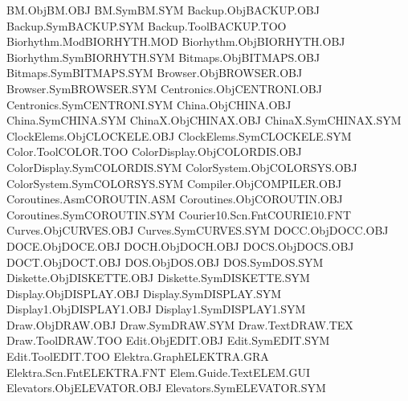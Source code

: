 BM.Obj                          BM.OBJ       
BM.Sym                          BM.SYM       
Backup.Obj                      BACKUP.OBJ   
Backup.Sym                      BACKUP.SYM   
Backup.Tool                     BACKUP.TOO   
Biorhythm.Mod                   BIORHYTH.MOD 
Biorhythm.Obj                   BIORHYTH.OBJ 
Biorhythm.Sym                   BIORHYTH.SYM 
Bitmaps.Obj                     BITMAPS.OBJ  
Bitmaps.Sym                     BITMAPS.SYM  
Browser.Obj                     BROWSER.OBJ  
Browser.Sym                     BROWSER.SYM  
Centronics.Obj                  CENTRONI.OBJ 
Centronics.Sym                  CENTRONI.SYM 
China.Obj                       CHINA.OBJ    
China.Sym                       CHINA.SYM    
ChinaX.Obj                      CHINAX.OBJ   
ChinaX.Sym                      CHINAX.SYM   
ClockElems.Obj                  CLOCKELE.OBJ 
ClockElems.Sym                  CLOCKELE.SYM 
Color.Tool                      COLOR.TOO    
ColorDisplay.Obj                COLORDIS.OBJ 
ColorDisplay.Sym                COLORDIS.SYM 
ColorSystem.Obj                 COLORSYS.OBJ 
ColorSystem.Sym                 COLORSYS.SYM 
Compiler.Obj                    COMPILER.OBJ 
Coroutines.Asm                  COROUTIN.ASM 
Coroutines.Obj                  COROUTIN.OBJ 
Coroutines.Sym                  COROUTIN.SYM 
Courier10.Scn.Fnt               COURIE10.FNT 
Curves.Obj                      CURVES.OBJ   
Curves.Sym                      CURVES.SYM   
DOCC.Obj                        DOCC.OBJ     
DOCE.Obj                        DOCE.OBJ     
DOCH.Obj                        DOCH.OBJ     
DOCS.Obj                        DOCS.OBJ     
DOCT.Obj                        DOCT.OBJ     
DOS.Obj                         DOS.OBJ      
DOS.Sym                         DOS.SYM      
Diskette.Obj                    DISKETTE.OBJ 
Diskette.Sym                    DISKETTE.SYM 
Display.Obj                     DISPLAY.OBJ  
Display.Sym                     DISPLAY.SYM  
Display1.Obj                    DISPLAY1.OBJ 
Display1.Sym                    DISPLAY1.SYM 
Draw.Obj                        DRAW.OBJ     
Draw.Sym                        DRAW.SYM     
Draw.Text                       DRAW.TEX     
Draw.Tool                       DRAW.TOO     
Edit.Obj                        EDIT.OBJ     
Edit.Sym                        EDIT.SYM     
Edit.Tool                       EDIT.TOO     
Elektra.Graph                   ELEKTRA.GRA  
Elektra.Scn.Fnt                 ELEKTRA.FNT  
Elem.Guide.Text                 ELEM.GUI     
Elevators.Obj                   ELEVATOR.OBJ 
Elevators.Sym                   ELEVATOR.SYM 
